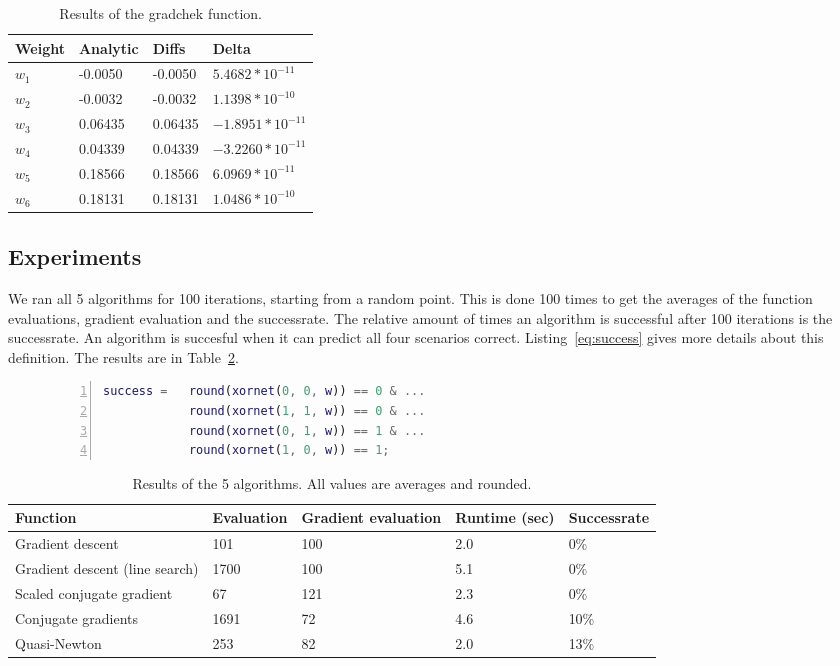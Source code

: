 \documentclass{article}
\begin{document}
\begin{table}[!h]
	\centering
	\begin{tabular}{| l | l | l | l |}
		\hline
		Weight & Analytic & Diffs & Delta \\ \hline
$w_1$ & -0.0050 & -0.0050 & $5.4682*10^{-11}$ \\ \hline
$w_2$ & -0.0032 & -0.0032 & $1.1398*10^{-10}$ \\ \hline
$w_3$ & 0.06435 & 0.06435 & $-1.8951*10^{-11}$ \\ \hline
$w_4$ & 0.04339 & 0.04339 & $-3.2260*10^{-11}$ \\ \hline
$w_5$ & 0.18566 & 0.18566 & $6.0969*10^{-11}$ \\ \hline
$w_6$ & 0.18131 & 0.18131 & $1.0486*10^{-10}$ \\ \hline
	\end{tabular}
	\caption{Results of the gradchek function.}
	\label{table:gradchek2}
\end{table}

\subsection{Experiments}
We ran all 5 algorithms for 100 iterations, starting from a random point. This is done 100 times to get the averages of the function evaluations, gradient evaluation and the successrate. The relative amount of times an algorithm is successful after 100 iterations is the successrate. An algorithm is succesful when it can predict all four scenarios correct. Listing~\ref{eq:success} gives more details about this definition. The results are in Table~\ref{table:results}. 

\begin{figure}[!h]
	\begin{lstlisting}[caption={Success condition of a set of weights.}, label={eq:success}, captionpos=b, language=matlab, numbers=left, tabsize=4, frame=single, basicstyle=\footnotesize, breaklines=true, deletekeywords={round}]
success = 	round(xornet(0, 0, w)) == 0 & ...
			round(xornet(1, 1, w)) == 0 & ... 
			round(xornet(0, 1, w)) == 1 & ...
			round(xornet(1, 0, w)) == 1;
	\end{lstlisting}
\end{figure}

\begin{table}[!h]
	\centering
	\begin{tabular}{| l | l | l | l | l |}
		\hline
		Function & Evaluation & Gradient evaluation & Runtime (sec) & Successrate \\ \hline
		Gradient descent & 101 & 100 & 2.0 & 0\% \\ \hline
		Gradient descent (line search) & 1700 & 100 & 5.1 & 0\% \\ \hline
		Scaled conjugate gradient & 67 & 121 & 2.3 & 0\% \\ \hline
		Conjugate gradients & 1691 & 72 & 4.6 & 10\% \\ \hline
		Quasi-Newton & 253 & 82 & 2.0 & 13\% \\ \hline
	\end{tabular}
	\caption{Results of the 5 algorithms. All values are averages and rounded.}
	\label{table:results}
\end{table}
\end{document}

